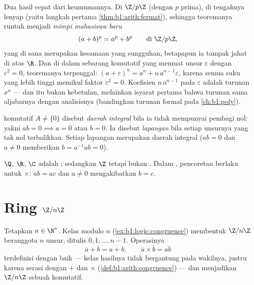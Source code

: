 \begin{example}\label{ex:b1:structures:binomialring}
Dua hasil cepat dari keumumannya. Di $\Z/p\Z$ (dengan $p$ prima),
 di tengahnya lenyap
(yaitu langkah pertama \cref{thm:b1:arith:fermat}), sehingga teoremanya
runtuh menjadi \emph{mimpi mahasiswa baru}
\[
(a + b)^p = a^p + b^p \qquad \text{di } \Z/p\Z ,
\]
yang di sana merupakan kesamaan yang sungguhan, betapapun ia tampak jahat di atas $\R$.
Dan di dalam sebarang  komutatif yang memuat unsur $\varepsilon$
dengan $\varepsilon^2 = 0$, teoremanya terpenggal:
$(a + \varepsilon)^n = a^n + n\,a^{n-1}\varepsilon$, karena semua suku
yang lebih tinggi memikul faktor $\varepsilon^2 = 0$. Koefisien
$n\,a^{n-1}$ pada $\varepsilon$ adalah turunan $x^n$ ---
dan itu bukan kebetulan, melainkan isyarat pertama bahwa turunan sama aljabarnya
dengan analisisnya (bandingkan turunan formal pada
\cref{ch:b1:poly}).
\end{example}

\begin{definition}\label{def:b1:structures:field}
 komutatif $A \neq \{0\}$ disebut \emph{daerah
integral} bila ia tidak mempunyai pembagi nol: yakni $ab = 0
\implies a = 0$ atau $b = 0$. Ia disebut \emph{lapangan} bila
setiap unsurnya yang tak nol terbalikkan. Setiap lapangan merupakan daerah
integral ($ab = 0$ dan $a \neq 0$ memberikan $b = a^{-1}ab = 0$).
\end{definition}

\begin{example}
$\Q$, $\R$, $\C$ adalah ; sedangkan $\Z$  tetapi bukan
. Dalam , pencoretan berlaku untuk $\times$: $ab =
ac$ dan $a \neq 0$ mengakibatkan $b = c$.
\end{example}

\section{Ring $\Z/n\Z$}

\begin{definition}\label{def:b1:structures:zn}
Tetapkan $n \in \N^*$. Kelas  modulo $n$
(\cref{ex:b1:logic:congruence}) membentuk 
$\Z/n\Z$ beranggota $n$ unsur, ditulis $\overline 0,
\overline 1, \dots, \overline{n-1}$. Operasinya
\[
\overline a + \overline b = \overline{a + b},
\qquad
\overline a \times \overline b = \overline{ab}
\]
terdefinisi dengan baik --- kelas hasilnya tidak bergantung pada
wakilnya, justru karena  serasi dengan $+$
dan $\times$ (\cref{def:b1:arith:congruence}) --- dan menjadikan $\Z/n\Z$
sebuah  komutatif.
\end{definition}

